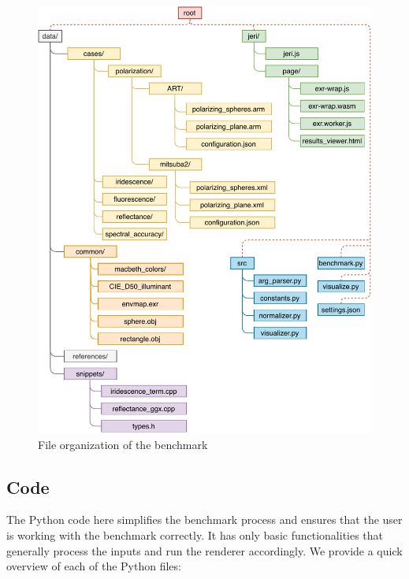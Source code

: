 \begin{figure}
	\centering
	\includegraphics[width=\linewidth]{img/framework.pdf}
	\caption{File organization of the benchmark}
	\label{fig:framework}
\end{figure}

\subsection{Code}

The Python code here simplifies the benchmark process and ensures that the user is working with the benchmark correctly. It has only basic functionalities that generally process the inputs and run the renderer accordingly. We provide a quick overview of each of the Python files:

